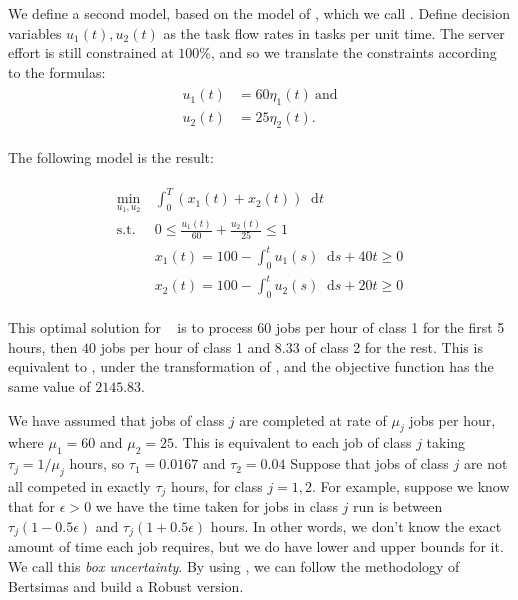 \documentclass[11pt,a4paper,titlepage]{article}
\newcommand*{\dd}{\ensuremath{\mathop{}\!\mathrm{d}}}%
\theoremstyle{definition}
\theoremstyle{plain}
\begin{document}
    We define a second model,
    based on the model of \autocite{bertsimas2014robust},
    which we call \modeltwo.
    Define  decision variables $u_1(t), u_2(t)$ as the task flow rates
    in tasks per unit time.
    The server effort is still constrained at $100\%$,
    and so we translate the constraints according to the formulas:
    \begin{align}
        \label{eq:model-2-translation}
        \begin{split}
            u_1(t) & = 60 \eta_1(t) ~ \text{and} \\
            u_2(t) & = 25 \eta_2(t).
        \end{split}
    \end{align}

    The following model is the result:

    \begin{align}
        \label{eq:model-2}
        \begin{split}
            \min\limits_{u_1, u_2}
            &~ \int_0^T \left( x_1(t) + x_2(t) \right) \dd t \\
            \text{s.t.}
            &~ 0 \leq \frac{u_1(t)}{60} + \frac{u_2(t)}{25} \leq 1 \\
            &~ x_1(t) = 100 - \int_0^t u_1(s) \dd s + 40t \geq 0 \\
            &~ x_2(t) = 100 - \int_0^t u_2(s) \dd s + 20t \geq 0
        \end{split}
    \end{align}

    This optimal solution for \modeltwo ~ is to process $60$ jobs per hour of class 1
    for the first 5 hours,
    then $40$ jobs per hour of class 1 and $8.33$ of class 2 for the rest.
    This is equivalent to \modelone,
    under the transformation of ,
    and the objective function has the same value of $2145.83$.

    We have assumed that jobs of class $j$ are completed at rate of $\mu_j$ jobs per hour,
    where $\mu_1=60$ and $\mu_2=25$.
    This is equivalent to each job of class $j$ taking $\tau_j=1/\mu_j$ hours,
    so $\tau_1=0.0167$ and $\tau_2 = 0.04$
    Suppose that jobs of class $j$ are not all competed in exactly $\tau_j$ hours,
    for class $j=1,2$.
    For example,
    suppose we know that for $\epsilon > 0$
    we have the time taken for jobs in class $j$ run is between
    $\tau_j (1 - 0.5 \epsilon)$
    and
    $\tau_j (1 + 0.5 \epsilon)$
    hours.
    In other words,
    we don't know the exact amount of time each job requires,
    but we do have lower and upper bounds for it.
    We call this \textit{box uncertainty}.
    By using \modeltwo,
    we can follow the methodology of Bertsimas and build a Robust version.
\end{document}
